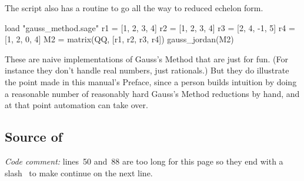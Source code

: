 The script also has a routine to go all the way to reduced echelon form.
\begin{sageoutput}[d,0,1]
load "gauss_method.sage"
r1 = [1, 2, 3, 4]
r2 = [1, 2, 3, 4]
r3 = [2, 4, -1, 5]
r4 = [1, 2, 0, 4]
M2 = matrix(QQ, [r1, r2, r3, r4])
gauss_jordan(M2)            
\end{sageoutput}

These are naive implementations of Gauss's Method that are just for fun.
(For instance they don't handle real numbers, just rationals.)
But they do illustrate the point made in this manual's Preface, 
since a person
builds intuition by doing a reasonable number of reasonably hard Gauss's Method
reductions by hand, and at that point automation can take over.


\subsection{Source of \protect{}}
\textit{Code comment:} lines~50 and~88 are too long
for this page so they end with a 
slash~\inlinecode{\\} to make \python{} continue on the
next line. 


\endinput


TODO:
